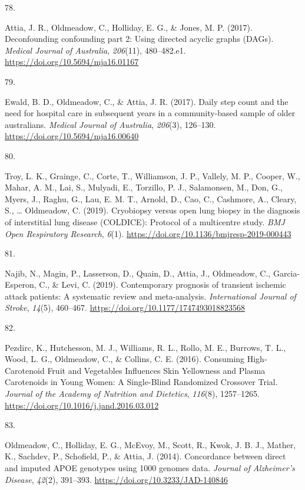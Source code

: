 \documentclass[11pt, a4paper]{awesome-cv}
\newlength{\csllabelwidth}
\newcommand{\CSLLeftMargin}[1]{\parbox[t]{\csllabelwidth}{#1}}
\newcommand{\CSLRightInline}[1]{\parbox[t]{\linewidth - \csllabelwidth}{#1}}
\begin{document}
\leavevmode\hypertarget{ref-attia_deconfounding_2017}{}%
\CSLLeftMargin{78. }
\CSLRightInline{Attia, J. R., Oldmeadow, C., Holliday, E. G., \& Jones,
M. P. (2017). Deconfounding confounding part 2: Using directed acyclic
graphs (DAGs). \emph{Medical Journal of Australia}, \emph{206}(11),
480--482.e1. \url{https://doi.org/10.5694/mja16.01167}}

\leavevmode\hypertarget{ref-ewald_daily_2017}{}%
\CSLLeftMargin{79. }
\CSLRightInline{Ewald, B. D., Oldmeadow, C., \& Attia, J. R. (2017).
Daily step count and the need for hospital care in subsequent years in a
community-based sample of older australians. \emph{Medical Journal of
Australia}, \emph{206}(3), 126--130.
\url{https://doi.org/10.5694/mja16.00640}}

\leavevmode\hypertarget{ref-troy_cryobiopsy_2019}{}%
\CSLLeftMargin{80. }
\CSLRightInline{Troy, L. K., Grainge, C., Corte, T., Williamson, J. P.,
Vallely, M. P., Cooper, W., Mahar, A. M., Lai, S., Mulyadi, E.,
Torzillo, P. J., Salamonsen, M., Don, G., Myers, J., Raghu, G., Lau, E.
M. T., Arnold, D., Cao, C., Cashmore, A., Cleary, S., \ldots{}
Oldmeadow, C. (2019). Cryobiopsy versus open lung biopsy in the
diagnosis of interstitial lung disease (COLDICE): Protocol of a
multicentre study. \emph{BMJ Open Respiratory Research}, \emph{6}(1).
\url{https://doi.org/10.1136/bmjresp-2019-000443}}

\leavevmode\hypertarget{ref-najib_contemporary_2019}{}%
\CSLLeftMargin{81. }
\CSLRightInline{Najib, N., Magin, P., Lasserson, D., Quain, D., Attia,
J., Oldmeadow, C., Garcia-Esperon, C., \& Levi, C. (2019). Contemporary
prognosis of transient ischemic attack patients: A systematic review and
meta-analysis. \emph{International Journal of Stroke}, \emph{14}(5),
460--467. \url{https://doi.org/10.1177/1747493018823568}}

\leavevmode\hypertarget{ref-pezdirc_consuming_2016}{}%
\CSLLeftMargin{82. }
\CSLRightInline{Pezdirc, K., Hutchesson, M. J., Williams, R. L., Rollo,
M. E., Burrows, T. L., Wood, L. G., Oldmeadow, C., \& Collins, C. E.
(2016). Consuming High-Carotenoid Fruit and Vegetables Influences Skin
Yellowness and Plasma Carotenoids in Young Women: A Single-Blind
Randomized Crossover Trial. \emph{Journal of the Academy of Nutrition
and Dietetics}, \emph{116}(8), 1257--1265.
\url{https://doi.org/10.1016/j.jand.2016.03.012}}

\leavevmode\hypertarget{ref-oldmeadow_concordance_2014}{}%
\CSLLeftMargin{83. }
\CSLRightInline{Oldmeadow, C., Holliday, E. G., McEvoy, M., Scott, R.,
Kwok, J. B. J., Mather, K., Sachdev, P., Schofield, P., \& Attia, J.
(2014). Concordance between direct and imputed APOE genotypes using 1000
genomes data. \emph{Journal of Alzheimer's Disease}, \emph{42}(2),
391--393. \url{https://doi.org/10.3233/JAD-140846}}
\end{document}
